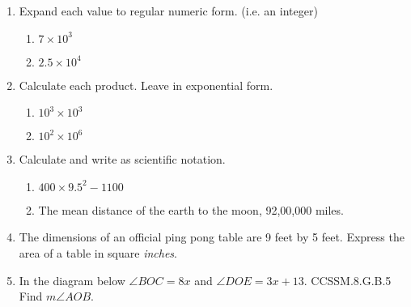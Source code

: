 \begin{enumerate}
\item Expand each value to regular numeric form. (i.e. an integer)
  \begin{multicols}{2}
    \begin{enumerate}[itemsep=1cm]
      \item $7 \times 10^{3}$
      \item $2.5 \times 10^{4}$
    \end{enumerate}
  \end{multicols} \vspace{1cm}

\item Calculate each product. Leave in exponential form.
  \begin{multicols}{2}
    \begin{enumerate}[itemsep=1cm]
      \item $10^{3} \times 10^{3}$
      \item $10^{2} \times 10^{6}$
    \end{enumerate}
  \end{multicols} \vspace{1cm}

\item Calculate and write as scientific notation.
  \begin{multicols}{2}
    \begin{enumerate}[itemsep=1cm]
      \item $400 \times 9.5^2-1100$
      \item The mean distance of the earth to the moon, 92,00,000 miles.
    \end{enumerate}
  \end{multicols} \vspace{1cm}

\item The dimensions of an official ping pong table are 9 feet by 5 feet. Express the area of a table in square \emph{inches}.

\newpage
    \item In the diagram below $\angle BOC = 8x$ and $\angle DOE = 3x+13$. \hfill CCSSM.8.G.B.5 \\Find $m\angle AOB$.
    \vspace{0.25cm}
    \begin{flushright}
    \end{flushright}


\end{enumerate}
